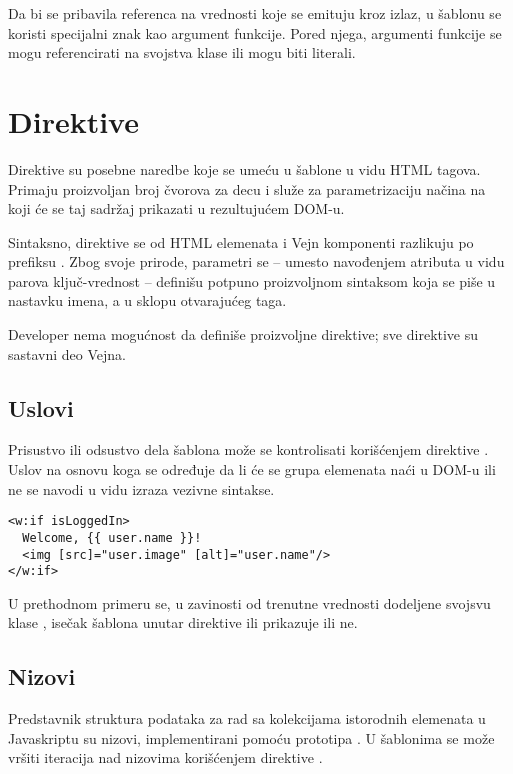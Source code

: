 Da bi se pribavila referenca na vrednosti koje se emituju kroz izlaz, u šablonu se koristi specijalni znak \code{\#} kao argument funkcije.
Pored njega, argumenti funkcije se mogu referencirati na svojstva klase ili mogu biti literali.

\section{Direktive}

Direktive su posebne naredbe koje se umeću u šablone u vidu HTML tagova.
Primaju proizvoljan broj čvorova za decu i služe za parametrizaciju načina na koji će se taj sadržaj prikazati u rezultujućem DOM-u.

Sintaksno, direktive se od HTML elemenata i Vejn komponenti razlikuju po prefiksu .
Zbog svoje prirode, parametri se -- umesto navođenjem atributa u vidu parova ključ-vrednost -- definišu potpuno proizvoljnom sintaksom koja se piše u nastavku imena, a u sklopu otvarajućeg taga.

Developer nema mogućnost da definiše proizvoljne direktive; sve direktive su sastavni deo Vejna.

\subsection{Uslovi}

Prisustvo ili odsustvo dela šablona može se kontrolisati korišćenjem direktive .
Uslov na osnovu koga se određuje da li će se grupa elemenata naći u DOM-u ili ne se navodi u vidu izraza vezivne sintakse.

\begin{verbatim}
<w:if isLoggedIn>
  Welcome, {{ user.name }}!
  <img [src]="user.image" [alt]="user.name"/>
</w:if>
\end{verbatim}

U prethodnom primeru se, u zavinosti od trenutne vrednosti dodeljene svojsvu klase , isečak šablona unutar direktive  ili prikazuje ili ne.

\subsection{Nizovi}

Predstavnik struktura podataka za rad sa kolekcijama istorodnih elemenata u Javaskriptu su nizovi, implementirani pomoću prototipa .
U šablonima se može vršiti iteracija nad nizovima korišćenjem direktive .

